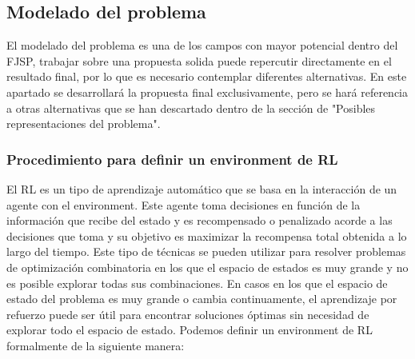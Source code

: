 \subsection{Modelado del problema}
El modelado del problema es una de los campos con mayor potencial dentro del FJSP, trabajar sobre una 
propuesta solida puede repercutir directamente en el resultado final, por lo que es necesario
contemplar diferentes alternativas. En este apartado se desarrollará la propuesta final exclusivamente,
pero se hará referencia a otras alternativas que se han descartado dentro de la sección de "Posibles
representaciones del problema".

\subsubsection{Procedimiento para definir un environment de RL}
El RL es un tipo de aprendizaje automático que se basa en la interacción de un agente con el environment. 
Este agente toma decisiones en función de la información que recibe del estado y es recompensado 
o penalizado acorde a las decisiones que toma y su objetivo es maximizar la recompensa total 
obtenida a lo largo del tiempo. Este tipo de técnicas se pueden utilizar para resolver problemas de optimización 
combinatoria en los que el espacio de estados es muy grande y no es posible explorar todas sus combinaciones. 
En casos en los que el espacio de estado del problema es muy grande o cambia continuamente,
el aprendizaje por refuerzo puede ser útil para encontrar soluciones óptimas sin necesidad de
explorar todo el espacio de estado. Podemos definir un environment de RL formalmente de la siguiente manera:


